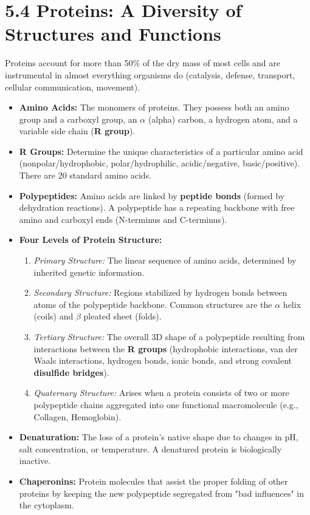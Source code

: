\documentclass[11pt, a4paper]{article}
\begin{document}
\section*{5.4 Proteins: A Diversity of Structures and Functions}
Proteins account for more than 50\% of the dry mass of most cells and are instrumental in almost everything organisms do (catalysis, defense, transport, cellular communication, movement).
\begin{itemize}
    \item \textbf{Amino Acids:} The monomers of proteins. They possess both an amino group and a carboxyl group, an $\alpha$ (alpha) carbon, a hydrogen atom, and a variable side chain (\textbf{R group}).
    \item \textbf{R Groups:} Determine the unique characteristics of a particular amino acid (nonpolar/hydrophobic, polar/hydrophilic, acidic/negative, basic/positive). There are 20 standard amino acids.
    \item \textbf{Polypeptides:} Amino acids are linked by \textbf{peptide bonds} (formed by dehydration reactions). A polypeptide has a repeating backbone with free amino and carboxyl ends (N-terminus and C-terminus).
    \item \textbf{Four Levels of Protein Structure:}
    \begin{enumerate}
        \item \textit{Primary Structure:} The linear sequence of amino acids, determined by inherited genetic information.
        \item \textit{Secondary Structure:} Regions stabilized by hydrogen bonds between atoms of the polypeptide backbone. Common structures are the $\alpha$ helix (coils) and $\beta$ pleated sheet (folds).
        \item \textit{Tertiary Structure:} The overall 3D shape of a polypeptide resulting from interactions between the \textbf{R groups} (hydrophobic interactions, van der Waals interactions, hydrogen bonds, ionic bonds, and strong covalent \textbf{disulfide bridges}).
        \item \textit{Quaternary Structure:} Arises when a protein consists of two or more polypeptide chains aggregated into one functional macromolecule (e.g., Collagen, Hemoglobin).
    \end{enumerate}
    \item \textbf{Denaturation:} The loss of a protein's native shape due to changes in pH, salt concentration, or temperature. A denatured protein is biologically inactive.
    \item \textbf{Chaperonins:} Protein molecules that assist the proper folding of other proteins by keeping the new polypeptide segregated from "bad influences" in the cytoplasm.
\end{itemize}
\end{document}
